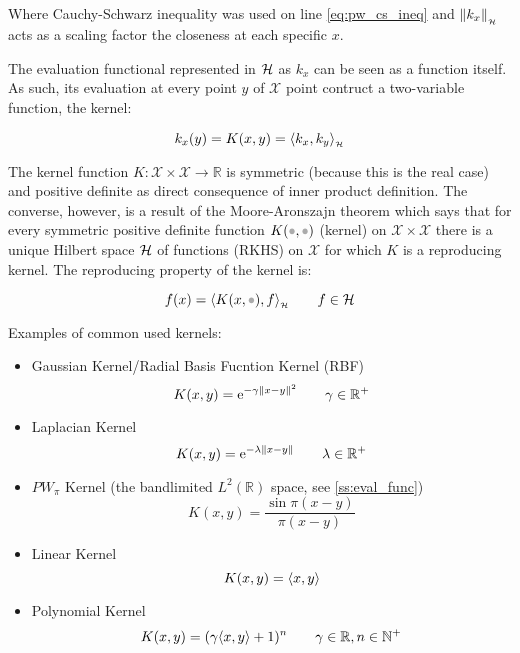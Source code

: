 Where Cauchy-Schwarz inequality was used on line \ref{eq:pw_cs_ineq} and
\(\left\lVert k_x\right\rVert_{_{\mathcal{H}}}\) acts as a scaling factor the closeness at each specific $x$.

The evaluation functional represented in $\mathcal{H}$ as $k_x$ can be seen as a
function itself. As such, its evaluation at every point $y$ of $\mathcal{X}$
point contruct a two-variable function, the kernel:

\begin{equation}
k_x(y) = K(x,y) = \langle k_x,k_y\rangle_{_{\mathcal{H}}}
\end{equation}

The kernel function \(K:\mathcal{X}\times\mathcal{X}\to\mathbb{R}\) is
symmetric (because this is the real case) and positive definite as direct consequence of
inner product definition. The converse, however, is a result of the
Moore-Aronszajn theorem which says that for every symmetric positive definite
function $K(\parm,\parm)$ (kernel) on \(\mathcal{X}\times\mathcal{X}\) there is a unique
Hilbert space $\mathcal{H}$ of functions (RKHS) on \(\mathcal{X}\) for which $K$ is a
reproducing kernel. The reproducing property of the kernel is:

\begin{equation}
f(x) = \hip{K(x,\parm)}{f} \qquad f \in \hs
\end{equation}

Examples of common used kernels:
\begin{itemize}
  \item Gaussian Kernel/Radial Basis Fucntion Kernel (RBF)
  \begin{equation}
  \label{eq:rbf}
  K(x,y) = \mathrm{e}^{-\gamma\left\lVert x-y\right\rVert^2} \qquad \gamma \in \mathbb{R}^+
  \end{equation}
  \item Laplacian Kernel
  \begin{equation*}
  K(x,y) = \mathrm{e}^{-\lambda\left\lVert x-y\right\rVert} \qquad \lambda \in \mathbb{R}^+
  \end{equation*}
  \item $PW_\pi$ Kernel (the bandlimited $L^2(\mathbb{R})$ space, see
  \ref{ss:eval_func})
  \begin{equation*}
  K(x,y) = \frac{\sin \pi(x-y)}{\pi(x-y)}
  \end{equation*}
  \item Linear Kernel
  \begin{equation*}
  K(x,y) = \langle x,y\rangle
  \end{equation*}
  \item Polynomial Kernel
  \begin{equation*}
  K(x,y) = (\gamma\langle x,y\rangle+1)^n \qquad \gamma \in \mathbb{R}, n \in
  \mathbb{N}^+
  \end{equation*}
\end{itemize}

